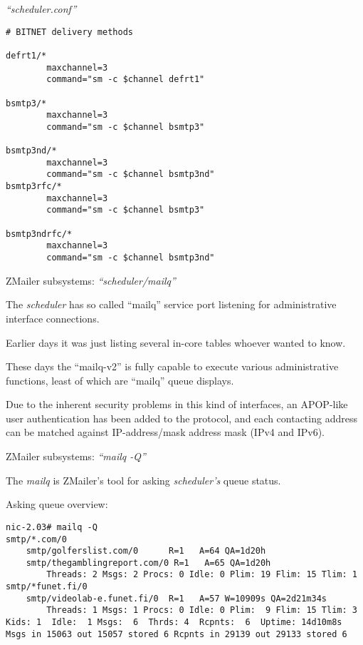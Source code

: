 \documentclass[a4paper,landscape]{slides}
\newcommand{\ZM}{ZMailer}
\begin{document}
\begin{overlay}
\small
\centerline{{\em ``scheduler.conf''}}
\tiny
\begin{verbatim}
# BITNET delivery methods

defrt1/*
        maxchannel=3
        command="sm -c $channel defrt1"

bsmtp3/*
        maxchannel=3
        command="sm -c $channel bsmtp3"

bsmtp3nd/*
        maxchannel=3
        command="sm -c $channel bsmtp3nd"
bsmtp3rfc/*
        maxchannel=3
        command="sm -c $channel bsmtp3"

bsmtp3ndrfc/*
        maxchannel=3
        command="sm -c $channel bsmtp3nd"
\end{verbatim}
\vfill
\end{overlay}



\begin{slide}
\centerline{\large \ZM{} subsystems: {\em ``scheduler/mailq''}}

The {\em scheduler} has so called ``mailq'' service port listening
for administrative interface connections.

Earlier days it was just listing several in-core tables whoever wanted
to know.

These days the ``mailq-v2'' is fully capable to execute various
administrative functions, least of which are ``mailq'' queue displays.

Due to the inherent security problems in this kind of interfaces,
an APOP-like user authentication has been added to the protocol,
and each contacting address can be matched against IP-address/mask
address mask (IPv4 and IPv6).

\vfill
\end{slide}

\begin{slide}
\centerline{\large \ZM{} subsystems: {\em ``mailq -Q''}}

The {\em mailq} is \ZM's tool for asking {\em scheduler's} queue status.

Asking queue overview:

{\tiny
\begin{verbatim}
nic-2.03# mailq -Q
smtp/*.com/0
    smtp/golferslist.com/0      R=1   A=64 QA=1d20h
    smtp/thegamblingreport.com/0 R=1   A=65 QA=1d20h
        Threads: 2 Msgs: 2 Procs: 0 Idle: 0 Plim: 19 Flim: 15 Tlim: 1
smtp/*funet.fi/0
    smtp/videolab-e.funet.fi/0  R=1   A=57 W=10909s QA=2d21m34s
        Threads: 1 Msgs: 1 Procs: 0 Idle: 0 Plim:  9 Flim: 15 Tlim: 3
Kids: 1  Idle:  1 Msgs:  6  Thrds: 4  Rcpnts:  6  Uptime: 14d10m8s
Msgs in 15063 out 15057 stored 6 Rcpnts in 29139 out 29133 stored 6
\end{verbatim}
}

\vfill
\end{slide}
\end{document}
